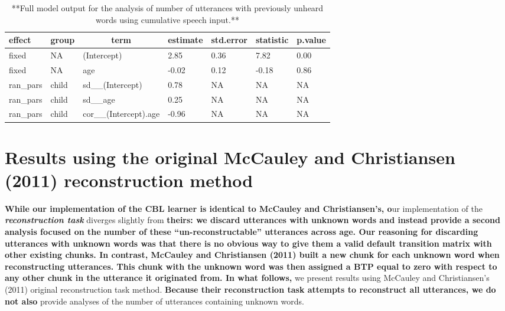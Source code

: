 \documentclass[man,mask,floatsintext]{apa6}
\begin{document}
\begin{table}[tbp]
\begin{center}
\begin{threeparttable}
\caption{\label{tab:tab-unseen_words-cumu-MAIN}**Full model output for the analysis of number of utterances with previously unheard words using cumulative speech input.**}
\begin{tabular}{lllllll}
\toprule
effect & \multicolumn{1}{c}{group} & \multicolumn{1}{c}{term} & \multicolumn{1}{c}{estimate} & \multicolumn{1}{c}{std.error} & \multicolumn{1}{c}{statistic} & \multicolumn{1}{c}{p.value}\\
\midrule
fixed & NA & (Intercept) & 2.85 & 0.36 & 7.82 & 0.00\\
fixed & NA & age & -0.02 & 0.12 & -0.18 & 0.86\\
ran\_pars & child & sd\_\_(Intercept) & 0.78 & NA & NA & NA\\
ran\_pars & child & sd\_\_age & 0.25 & NA & NA & NA\\
ran\_pars & child & cor\_\_(Intercept).age & -0.96 & NA & NA & NA\\
\bottomrule
\end{tabular}
\end{threeparttable}
\end{center}
\end{table}

\pagebreak

\section{Results using the original McCauley and Christiansen (2011)
reconstruction
method}\label{results-using-the-original-mccauley-and-christiansen-2011-reconstruction-method}

\textbf{While our implementation of the CBL learner is identical to
McCauley and Christiansen's, o}ur implementation of the
\textbf{\emph{reconstruction task}} diverges slightly from
\textbf{theirs: we discard utterances with unknown words and instead
provide a second analysis focused on the number of these
\enquote{un-reconstructable} utterances across age. Our reasoning for
discarding utterances with unknown words was that there is no obvious
way to give them a valid default transition matrix with other existing
chunks. In contrast, McCauley and Christiansen (2011) built a new chunk
for each unknown word when reconstructing utterances. This chunk with
the unknown word was then assigned a BTP equal to zero with respect to
any other chunk in the utterance it originated from. In what follows,}
we present results using McCauley and Christiansen's (2011) original
reconstruction task method. \textbf{Because their reconstruction task
attempts to reconstruct all utterances, we do not also} provide analyses
of the number of utterances containing unknown words.
\end{document}
